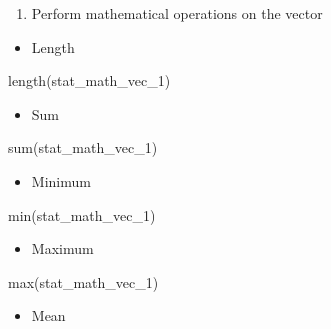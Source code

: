\documentclass[
  letterpaper,
  DIV=11,
  numbers=noendperiod]{scrreprt}
\newenvironment{Shaded}{}{}
\newcommand{\FunctionTok}[1]{\textcolor[rgb]{0.44,0.26,0.76}{#1}}
\newcommand{\NormalTok}[1]{\textcolor[rgb]{0.14,0.16,0.18}{#1}}
\providecommand{\tightlist}{%
  \setlength{\itemsep}{0pt}\setlength{\parskip}{0pt}}\usepackage{longtable,booktabs,array}
\begin{document}
\begin{enumerate}
\def\labelenumi{\alph{enumi}.}
\setcounter{enumi}{1}
\tightlist
\item
  Perform mathematical operations on the vector
\end{enumerate}

\begin{itemize}
\tightlist
\item
  Length
\end{itemize}

\begin{Shaded}
\begin{Highlighting}[]
\FunctionTok{length}\NormalTok{(stat\_math\_vec\_1)}
\end{Highlighting}
\end{Shaded}

\begin{itemize}
\tightlist
\item
  Sum
\end{itemize}

\begin{Shaded}
\begin{Highlighting}[]
\FunctionTok{sum}\NormalTok{(stat\_math\_vec\_1)}
\end{Highlighting}
\end{Shaded}

\begin{itemize}
\tightlist
\item
  Minimum
\end{itemize}

\begin{Shaded}
\begin{Highlighting}[]
\FunctionTok{min}\NormalTok{(stat\_math\_vec\_1)}
\end{Highlighting}
\end{Shaded}

\begin{itemize}
\tightlist
\item
  Maximum
\end{itemize}

\begin{Shaded}
\begin{Highlighting}[]
\FunctionTok{max}\NormalTok{(stat\_math\_vec\_1)}
\end{Highlighting}
\end{Shaded}

\begin{itemize}
\tightlist
\item
  Mean
\end{itemize}
\end{document}
